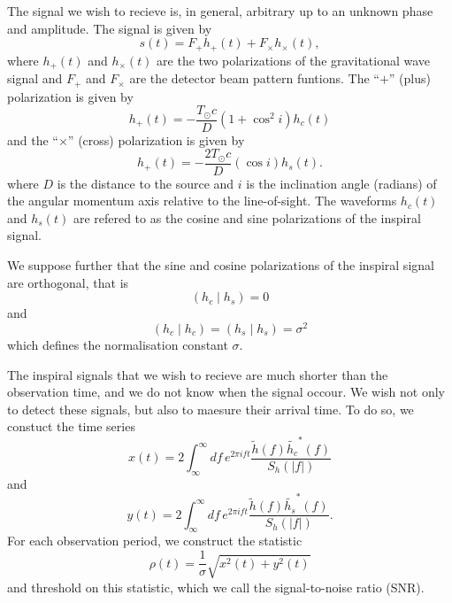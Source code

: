 The signal we wish to recieve is, in general, arbitrary up to an unknown phase
and amplitude. The signal is given by
\begin{equation}
s(t)= F_{+}h_{+}(t) + F_{\times}h_{\times}(t),
\end{equation}
where $h_{+}(t)$ and $h_{\times}(t)$ are the two polarizations of the
gravitational wave signal and $F_{+}$ and $F_{\times}$ are the detector beam
pattern funtions. The ``$+$'' (plus) polarization is given by
\begin{equation}
h_{+}(t) = -\frac{T_\odot c}{D}(1 + \cos^2 i)h_c(t)
\end{equation}
and the ``$\times$'' (cross) polarization is given by
\begin{equation}
h_{+}(t) = -\frac{2 T_\odot c}{D}(\cos i)h_s(t).
\end{equation}
where $D$ is the distance to the source and $i$ is the inclination angle
(radians) of the angular momentum axis relative to the line-of-sight. The
waveforms $h_c(t)$ and $h_s(t)$ are refered to as the cosine and sine
polarizations of the inspiral signal.

We suppose further that the sine and cosine polarizations of the inspiral
signal are orthogonal, that is
\begin{equation}
\left(h_c\mid h_s\right) = 0
\end{equation}
and
\begin{equation}
\left(h_c\mid h_c\right) = \left(h_s\mid h_s\right) = \sigma^2
\end{equation}
which defines the normalisation constant $\sigma$.

The inspiral signals that we wish to recieve are much shorter than the
observation time, and we do not know when the signal occour. We wish not only
to detect these signals, but also to maesure their arrival time. To do so, we
constuct the time series
\begin{equation}
x(t) = 2 \int_{\infty}^{\infty}df\,e^{2\pi i f t} 
\frac{\tilde{h}(f) \tilde{h_c}^\ast(f)}{S_h\left(\left|f\right|\right)}
\end{equation}
and
\begin{equation}
y(t) = 2 \int_{\infty}^{\infty}df\,e^{2\pi i f t} 
\frac{\tilde{h}(f) \tilde{h_s}^\ast(f)}{S_h\left(\left|f\right|\right)}.
\end{equation}
For each observation period, we construct the statistic
\begin{equation}
\rho(t) = \frac{1}{\sigma}\sqrt{x^2(t) + y^2(t)}
\end{equation}
and threshold on this statistic, which we call the signal-to-noise ratio
(SNR).

